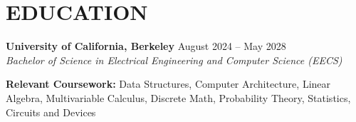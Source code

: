 \section*{EDUCATION}
\noindent
\textbf{University of California, Berkeley} \hfill August 2024 -- May 2028 \\
\textit{Bachelor of Science in Electrical Engineering and Computer Science (EECS)}

\noindent
\textbf{Relevant Coursework:} Data Structures, Computer Architecture, Linear Algebra, Multivariable Calculus, Discrete Math, Probability Theory, Statistics, Circuits and Devices
